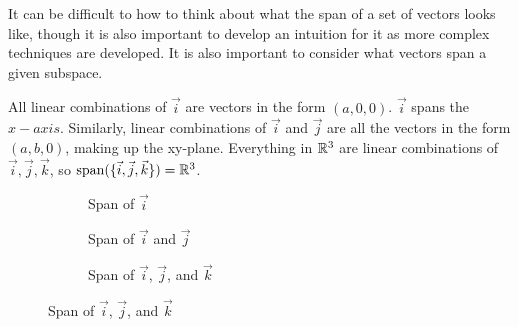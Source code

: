 It can be difficult to how to think about what the span of a set of vectors looks like, though it is also important to develop
an intuition for it as more complex techniques are developed. It is also important to consider what vectors span a given subspace.

All linear combinations of $\vec{i}$ are vectors in the form $(a,0,0)$. $\vec{i}$ spans the $x-axis$. Similarly, linear combinations of $\vec{i}$ and $\vec{j}$ are all the vectors in the form $(a,b,0)$, making up the xy-plane. Everything in $\mathbb{R}^3$ are linear combinations of $\vec{i},\vec{j},\vec{k}$, so $\textrm{span}(\{\vec{i},\vec{j},\vec{k}\})=\mathbb{R}^3$.\\
\begin{figure}[h]
	\centering
	\begin{subfigure}[l]{0.2\textwidth}
		\centering
		\caption{Span of $\vec{i}$}
	\end{subfigure}\begin{subfigure}[l]{0.3\textwidth}
		\centering
		
		\caption{Span of $\vec{i}$ and $\vec{j}$}
	\end{subfigure}
	\begin{subfigure}[l]{0.3\textwidth}
		\centering
		\caption{Span of $\vec{i}$, $\vec{j}$, and $\vec{k}$}
	\end{subfigure}
\end{figure}
